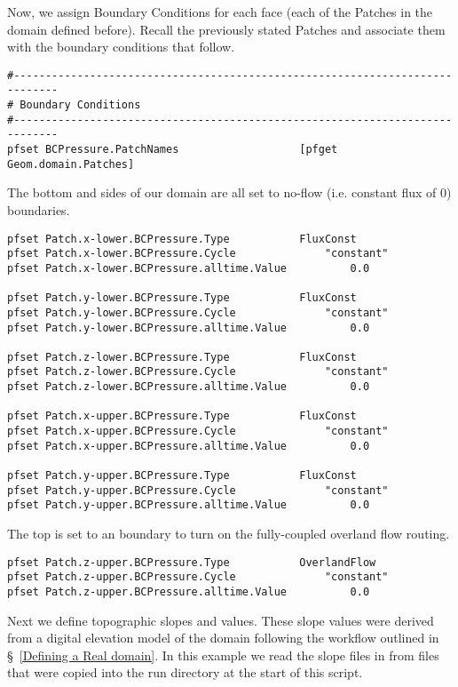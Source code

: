 Now, we assign Boundary Conditions for each face (each of the Patches in the domain defined before).  
Recall the previously stated Patches and associate them with the boundary conditions that follow.

\begin{verbatim}
#-----------------------------------------------------------------------------
# Boundary Conditions
#-----------------------------------------------------------------------------
pfset BCPressure.PatchNames                   [pfget Geom.domain.Patches]
\end{verbatim}

The bottom and sides of our domain are all set to no-flow (i.e. constant flux of 0) boundaries.

\begin{verbatim}
pfset Patch.x-lower.BCPressure.Type		      FluxConst
pfset Patch.x-lower.BCPressure.Cycle		      "constant"
pfset Patch.x-lower.BCPressure.alltime.Value	      0.0

pfset Patch.y-lower.BCPressure.Type		      FluxConst
pfset Patch.y-lower.BCPressure.Cycle		      "constant"
pfset Patch.y-lower.BCPressure.alltime.Value	      0.0

pfset Patch.z-lower.BCPressure.Type		      FluxConst
pfset Patch.z-lower.BCPressure.Cycle		      "constant"
pfset Patch.z-lower.BCPressure.alltime.Value	      0.0

pfset Patch.x-upper.BCPressure.Type		      FluxConst
pfset Patch.x-upper.BCPressure.Cycle		      "constant"
pfset Patch.x-upper.BCPressure.alltime.Value	      0.0

pfset Patch.y-upper.BCPressure.Type		      FluxConst
pfset Patch.y-upper.BCPressure.Cycle		      "constant"
pfset Patch.y-upper.BCPressure.alltime.Value	      0.0
\end{verbatim}

The top is set to an  boundary to turn on the fully-coupled overland flow
routing. 

\begin{verbatim}
pfset Patch.z-upper.BCPressure.Type		      OverlandFlow
pfset Patch.z-upper.BCPressure.Cycle		      "constant"
pfset Patch.z-upper.BCPressure.alltime.Value	      0.0
\end{verbatim}

Next we define topographic slopes and values. These slope values were derived from a digital
elevation model of the domain following the workflow outlined in \S~\ref{Defining a Real domain}.
In this example we read the slope files in from  files that were copied into the run directory
at the start of this script. 

